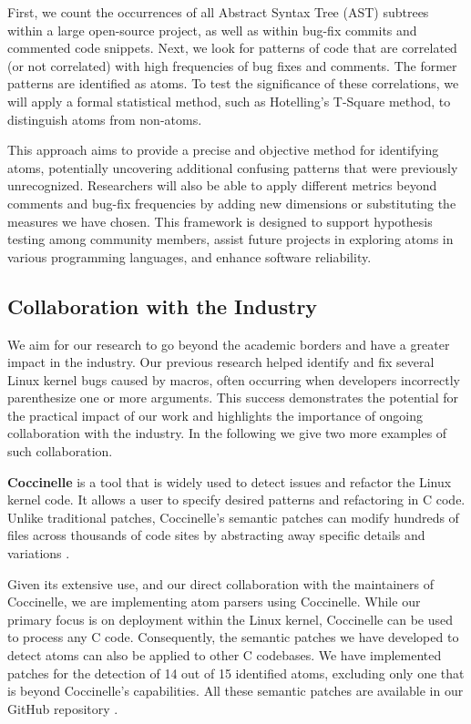 \documentclass[conference]{IEEEtran}
\begin{document}
First, we count the occurrences of all Abstract Syntax Tree 
(AST) subtrees within a large open-source project, as well as 
within bug-fix commits and commented code snippets. Next, we 
look for patterns of code that are correlated (or not 
correlated) with high frequencies of bug fixes and comments. 
The former patterns are identified as atoms. To test the 
significance of these correlations, we will apply a formal 
statistical method, such as Hotelling’s T-Square method, to 
distinguish atoms from non-atoms.

This approach aims to provide a precise and objective method 
for identifying atoms, potentially uncovering additional 
confusing patterns that were previously unrecognized. 
Researchers will also be able to apply different metrics 
beyond comments and bug-fix frequencies by adding new 
dimensions or substituting the measures we have chosen. This 
framework is designed to support hypothesis testing among 
community members, assist future projects in exploring atoms 
in various programming languages, and enhance software 
reliability.


\subsection{Collaboration with the Industry}

We aim for our research to go beyond the 
academic borders and have a greater impact in the industry. 
Our previous research helped identify and fix several Linux kernel bugs caused by macros, often occurring when developers incorrectly parenthesize one or more arguments. This success demonstrates 
the potential for the practical impact of our work and 
highlights the importance of ongoing collaboration with 
the industry. In the following we give two more examples of such collaboration. 

\textbf{Coccinelle}
%
is a tool that is widely used to detect issues and refactor the Linux kernel code. It allows
a user to specify desired patterns  
and refactoring in C code. 
Unlike traditional patches, Coccinelle's semantic patches can modify 
hundreds of files across thousands of code sites by 
abstracting away specific details and variations \cite{coccinelle}.

Given its extensive use, and our direct collaboration with the 
maintainers of Coccinelle, we are implementing  
atom parsers using Coccinelle. While our primary focus is on 
deployment within the Linux kernel, Coccinelle can be used to 
process any C code. Consequently, the semantic patches we have 
developed to detect atoms can also be applied to other C 
codebases. We have implemented patches for the detection of 14 
out of 15 identified atoms, excluding only one that is beyond 
Coccinelle's capabilities. All these semantic patches are available in our GitHub repository \cite{githubcocci}. 
\end{document}
